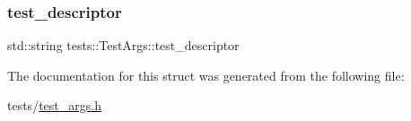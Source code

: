 \subsubsection{\texorpdfstring{test\+\_\+descriptor}{test\_descriptor}}
{\footnotesize\ttfamily std\+::string tests\+::\+Test\+Args\+::test\+\_\+descriptor}



The documentation for this struct was generated from the following file\+:\begin{DoxyCompactItemize}
\item 
tests/\hyperlink{test__args_8h}{test\+\_\+args.\+h}\end{DoxyCompactItemize}

